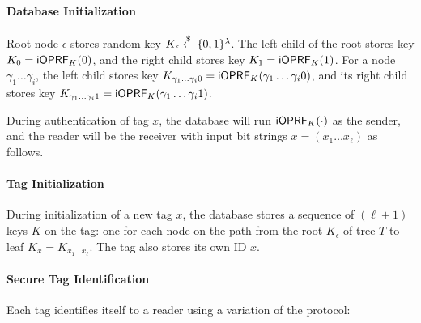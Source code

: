 \paragraph{Database Initialization}
Root node $\epsilon$ stores random key
$K_{\epsilon}\stackrel{\$}{\leftarrow}\{0,1\}^\lambda$.  The left child of the root stores
key $K_0=\mathsf{i}\mathsf{OPRF}_K(0)$, and the right child stores key
$K_1=\mathsf{i}\mathsf{OPRF}_K(1)$. For a node $\gamma_1\ldots\gamma_i$,
the left child stores key
$K_{\gamma_1\ldots\gamma_i0}=\mathsf{i}\mathsf{OPRF}_K(\gamma_1\ldots\gamma_i0)$, and its
right child stores key
$K_{\gamma_1\ldots\gamma_i1}=\mathsf{i}\mathsf{OPRF}_K(\gamma_1\ldots\gamma_i1)$.

During authentication of tag $x$, the database will run
$\mathsf{i}\mathsf{OPRF}_K(\cdot)$ as the sender, and the reader will be the receiver
with input bit strings $x=(x_1\ldots{}x_\ell)$ as follows.

\paragraph{Tag Initialization}
During initialization of a new tag $x$, the database stores a sequence
of $(\ell+1)$ keys $K$ on the tag: one for each node on the path from
the root $K_\epsilon$ of tree $T$ to leaf
$K_x=K_{x_1\ldots{}x_\ell}$. The tag also stores its own ID $x$.

\paragraph{Secure Tag Identification}
 Each tag identifies itself to a reader using a variation of
  the \citeauthor{molnar} protocol:

